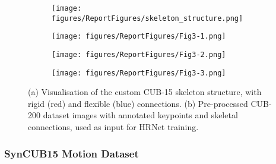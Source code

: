 \documentclass[final-report]{report-template}
\begin{document}
\begin{figure}[H]
    \centering

    \begin{subfigure}[t]{0.3\textwidth}
        \centering
        \texttt{[image: figures/ReportFigures/skeleton\_structure.png]}
        \caption{}
        \label{fig:top_frame}
    \end{subfigure}

    \vspace{0.8em}

    \begin{minipage}{0.80\textwidth} %
        \centering
        \begin{subfigure}[t]{0.30\textwidth}
            \centering
            \texttt{[image: figures/ReportFigures/Fig3-1.png]}
        \end{subfigure}\hfill
        \begin{subfigure}[t]{0.30\textwidth}
            \centering
            \texttt{[image: figures/ReportFigures/Fig3-2.png]}
            \caption{}
            \label{fig:frame4}
        \end{subfigure}\hfill
        \begin{subfigure}[t]{0.30\textwidth}
            \centering
            \texttt{[image: figures/ReportFigures/Fig3-3.png]}
        \end{subfigure}
    \end{minipage}

    \caption{(a) Visualisation of the custom CUB-15 skeleton structure, with rigid (red) and flexible (blue) connections.
    (b) Pre-processed CUB-200 dataset images with annotated keypoints and skeletal connections, used as input for HRNet training.}
    \label{fig:frame_comparison_1}
\end{figure}






\subsubsection{SynCUB15 Motion Dataset}
\end{document}
